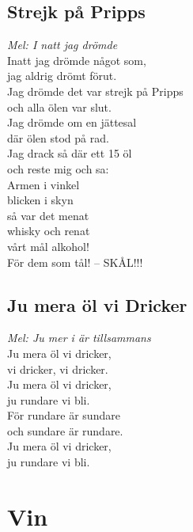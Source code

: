 \documentclass[twoside, openright]{report}
\begin{document}
\section{Strejk på Pripps}
\textit{Mel: I natt jag drömde}\\

Inatt jag drömde något som,\\
jag aldrig drömt förut.\\
Jag drömde det var strejk på Pripps\\
och alla ölen var slut.\\
Jag drömde om en jättesal\\
där ölen stod på rad.\\
Jag drack så där ett 15 öl\\
och reste mig och sa:\\
Armen i vinkel\\
blicken i skyn\\
så var det menat\\
whisky och renat\\
vårt mål alkohol!\\
För dem som tål! -- SKÅL!!!\\

\section{Ju mera öl vi Dricker}
\textit{Mel: Ju mer i är tillsammans}\\

Ju mera öl vi dricker,\\
vi dricker, vi dricker.\\
Ju mera öl vi dricker,\\
ju rundare vi bli.\\
För rundare är sundare\\
och sundare är rundare.\\
Ju mera öl vi dricker,\\
ju rundare vi bli.\\

\chapter{Vin}
\end{document}
